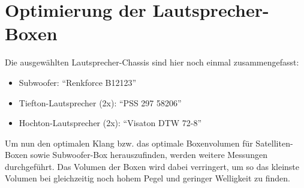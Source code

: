 

\newpage
\section{Optimierung der Lautsprecher-Boxen}\label{sec:4.4}
Die ausgewählten Lautsprecher-Chassis sind hier noch einmal zusammengefasst:
\begin{itemize}
	\item Subwoofer: \enquote{Renkforce B12123}
	\item Tiefton-Lautsprecher (2x): \enquote{PSS 297 58206}
	\item Hochton-Lautsprecher (2x): \enquote{Visaton DTW 72-8}
\end{itemize}
Um nun den optimalen Klang bzw. das optimale Boxenvolumen für Satelliten-Boxen sowie Subwoofer-Box herauszufinden, werden weitere Messungen durchgeführt.
Das Volumen der Boxen wird dabei verringert, um so das kleinste Volumen bei gleichzeitig noch hohem Pegel und geringer Welligkeit zu finden.

